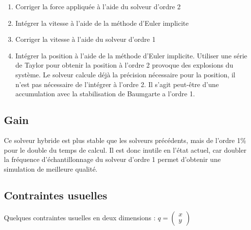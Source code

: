 \documentclass[11pt, letterpaper]{report}
\begin{document}
    \begin{enumerate}
        \item Corriger la force appliquée à l'aide du solveur d'ordre 2
        \item Intégrer la vitesse à l'aide de la méthode d'Euler implicite
        \item Corriger la vitesse à l'aide du solveur d'ordre 1
        \item Intégrer la position à l'aide de la méthode d'Euler implicite.
        Utiliser une série de Taylor pour obtenir la position à l'ordre 2 provoque des explosions du système.
        Le solveur calcule déjà la précision nécessaire pour la position, il n'est pas nécessaire de l'intégrer à l'ordre 2.
        Il s'agit peut-être d'une accumulation avec la stabilisation de Baumgarte a l'ordre 1.
    \end{enumerate}

    \subsection{Gain}\label{subsec:problemes-rencontres-hybride}
    Ce solveur hybride est plus stable que les solveurs précédents, mais de l'ordre 1\% pour le double du temps de calcul.
    Il est donc inutile en l'état actuel, car doubler la fréquence d'échantillonnage du solveur d'ordre 1 permet d'obtenir une simulation de meilleure qualité.

    \subsection{Contraintes usuelles}\label{subsec:contraintes-usuelles}
    Quelques contraintes usuelles en deux dimensions :
    $q = \begin{pmatrix}
             x\\
             y
    \end{pmatrix}$
\end{document}
